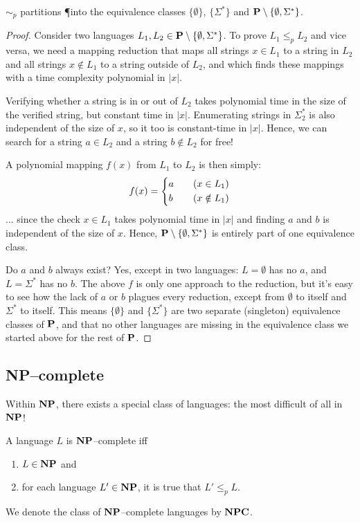 \begin{theorem}
	$\sim_p$ partitions \P into the equivalence classes $\{\emptyset\}$, $\{\Sigma^*\}$ and $\P \setminus \{\emptyset, \Sigma^*\}$.
\end{theorem}
\begin{proof}
Consider two languages $L_1,L_2\in \P \setminus \{\emptyset, \Sigma^*\}$. To prove $L_1 \leq_p L_2$ and vice versa, we need a mapping reduction that maps all strings $x\in L_1$ to a string in $L_2$ and all strings $x\notin L_1$ to a string outside of $L_2$, and which finds these mappings with a time complexity polynomial in $|x|$.

Verifying whether a string is in or out of $L_2$ takes polynomial time in the size of the verified string, but constant time in $|x|$. Enumerating strings in $\Sigma_2^*$ is also independent of the size of $x$, so it too is constant-time in $|x|$. Hence, we can search for a string $a \in L_2$ and a string $b \notin L_2$ for free!

A polynomial mapping $f(x)$ from $L_1$ to $L_2$ is then simply:
\begin{equation*}
	f(x) = \begin{dcases}
		a &\quad(x\in L_1)\\
		b &\quad(x\notin L_1)
	\end{dcases}
\end{equation*}
... since the check $x\in L_1$ takes polynomial time in $|x|$ and finding $a$ and $b$ is independent of the size of $x$. Hence, $\P \setminus \{\emptyset, \Sigma^*\}$ is entirely part of one equivalence class.

Do $a$ and $b$ always exist? Yes, except in two languages: $L = \emptyset$ has no $a$, and $L = \Sigma^*$ has no $b$. The above $f$ is only one approach to the reduction, but it's easy to see how the lack of $a$ or $b$ plagues every reduction, except from $\emptyset$ to itself and $\Sigma^*$ to itself. This means $\{\emptyset\}$ and $\{\Sigma^*\}$ are two separate (singleton) equivalence classes of $\P$, and that no other languages are missing in the equivalence class we started above for the rest of $\P$.
\end{proof}

\subsection{NP--complete}
Within $\NP$, there exists a special class of languages: the most
difficult of all in $\NP$!

\begin{definition} \label{defnpc}
	A language $L$ is $\NP$--complete iff
	\begin{enumerate}
		\item $L\in \NP$ and
		\item for each language $L'\in\NP$, it is true that $L' \leq_p  L$.
	\end{enumerate}
	We denote the class of $\NP$--complete languages by $\NPC$.
\end{definition}

